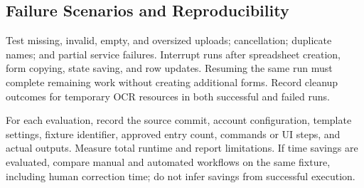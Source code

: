 \subsection{Failure Scenarios and Reproducibility}
Test missing, invalid, empty, and oversized uploads; cancellation; duplicate
names; and partial service failures. Interrupt runs after spreadsheet creation,
form copying, state saving, and row updates. Resuming the same run must complete
remaining work without creating additional forms. Record cleanup outcomes for
temporary OCR resources in both successful and failed runs.

For each evaluation, record the source commit, account configuration, template
settings, fixture identifier, approved entry count, commands or UI steps, and
actual outputs. Measure total runtime and report limitations. If time savings
are evaluated, compare manual and automated workflows on the same fixture,
including human correction time; do not infer savings from successful execution.
